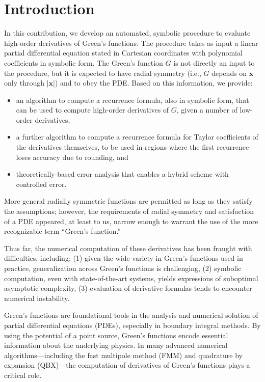 \documentclass[12pt]{article}
\let\b=\boldsymbol
\theoremstyle{definition}
\theoremstyle{plain}
\theoremstyle{definition}
\begin{document}
\section{Introduction}
In this contribution, we develop an automated, symbolic procedure to evaluate high-order derivatives of Green's functions. The procedure takes as input a linear partial differential equation stated in Cartesian coordinates with polynomial coefficients in symbolic form. The Green's function $G$ is not directly an input to the procedure, but it is expected to have radial symmetry (i.e., $G$ depends on $\b{x}$ only through $|\b{x}|$) and to obey the PDE. Based on this information, we provide:
\begin{itemize}
\item an algorithm to compute a recurrence formula, also in symbolic form, that can be used to compute high-order derivatives of $G$, given a number of low-order derivatives,
\item a further algorithm to compute a recurrence formula for Taylor coefficients of the derivatives themselves, to be used in regions where the first recurrence loses accuracy due to rounding, and
\item theoretically-based error analysis that enables a hybrid scheme with controlled error.
\end{itemize}
More general radially symmetric functions are permitted as long as they satisfy the assumptions; however, the requirements of radial symmetry and satisfaction of a PDE appeared, at least to us, narrow enough to warrant the use of the more recognizable term ``Green's function.''

Thus far, the numerical computation of these derivatives has been fraught with difficulties, including: (1) given the wide variety in Green's functions used in practice, generalization across Green's functions is challenging, (2) symbolic computation, even with state-of-the-art systems, yields expressions of suboptimal asymptotic complexity, (3) evaluation of derivative formulas tends to encounter numerical instability.

Green’s functions are foundational tools in the analysis and numerical solution of partial differential equations (PDEs), especially in boundary integral methods. By using the potential of a point source, Green’s functions encode essential information about the underlying physics. In many advanced numerical algorithms—including the fast multipole method (FMM) and quadrature by expansion (QBX)—the computation of derivatives of Green’s functions plays a critical role.
\end{document}
